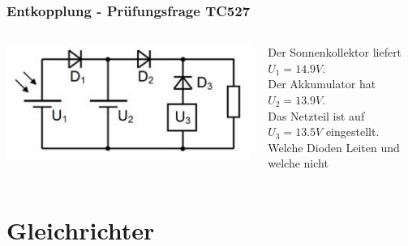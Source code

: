 \begin{frame}
    \frametitle{Entkopplung - Prüfungsfrage TC527}
    \begin{columns}[c]
        \column[c]{5cm}
        \begin{center}
            \includegraphics[width=1\textwidth]{a05/TC527.png}\\
            \tiny \hyperlink{refs}{\cite{bna}}
    \end{center}
    \column{5cm}
	Der Sonnenkollektor liefert $U_1 = 14.9V$. \\Der Akkumulator hat $U_2 = 13.9V$. \\Das Netzteil ist auf $U_3 = 13.5V$ eingestellt. \\
	Welche Dioden Leiten und welche nicht
    \end{columns}
\end{frame}

\section*{Gleichrichter}

